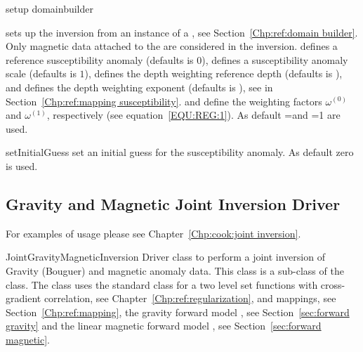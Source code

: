 \begin{methoddesc}[MagneticInversion]{setup}{
domainbuilder
}

sets up the inversion from an instance  of a , see Section~\ref{Chp:ref:domain builder}.
Only magnetic data attached to the  are considered in the inversion.
 defines a reference susceptibility anomaly (defaults is 0), 
 defines a susceptibility anomaly scale (defaults is $1$),
 defines the depth weighting reference depth (defaults is \None), and
 defines the depth weighting exponent (defaults is \None),
see  in Section~\ref{Chp:ref:mapping susceptibility}.
 and  define the weighting factors
$\omega^{(0)}$ and
$\omega^{(1)}$, respectively (see equation~\ref{EQU:REG:1}).
As default =\None and =1 are used.
\end{methoddesc}

\begin{methoddesc}[MagneticInversion]{setInitialGuess}{}
set an initial guess for the susceptibility anomaly. As default zero is used.
\end{methoddesc}

\subsection{Gravity and Magnetic Joint Inversion Driver}
For examples of usage please see Chapter~\ref{Chp:cook:joint inversion}.

\begin{classdesc}{JointGravityMagneticInversion}{}
Driver class to perform a joint inversion of  Gravity (Bouguer) and magnetic anomaly data. This class
is a sub-class of the  class. 
The class uses the standard
 class for a two level set functions with cross-gradient correlation, see Chapter~\ref{Chp:ref:regularization},
 and  mappings, see Section~\ref{Chp:ref:mapping}, the 
gravity forward model , see Section~\ref{sec:forward gravity}
and the linear
magnetic forward model , see Section~\ref{sec:forward magnetic}.
\end{classdesc}


